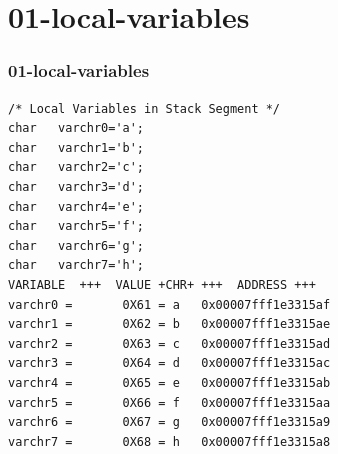 \documentclass[xcolor=table, notheorems, hyperref={pdfpagelabels=false}]{beamer}
\begin{document}
\section{01-local-variables}
\begin{frame}[fragile]
\frametitle{01-local-variables}


\begin{lstlisting}[basicstyle=\ttfamily\footnotesize]
/* Local Variables in Stack Segment */
char   varchr0='a';
char   varchr1='b';
char   varchr2='c';
char   varchr3='d';
char   varchr4='e';
char   varchr5='f';
char   varchr6='g';
char   varchr7='h';
VARIABLE  +++  VALUE +CHR+ +++  ADDRESS +++
varchr0 =       0X61 = a   0x00007fff1e3315af
varchr1 =       0X62 = b   0x00007fff1e3315ae
varchr2 =       0X63 = c   0x00007fff1e3315ad
varchr3 =       0X64 = d   0x00007fff1e3315ac
varchr4 =       0X65 = e   0x00007fff1e3315ab
varchr5 =       0X66 = f   0x00007fff1e3315aa
varchr6 =       0X67 = g   0x00007fff1e3315a9
varchr7 =       0X68 = h   0x00007fff1e3315a8
\end{lstlisting}

\begin{minipage}[t]{120mm}


\end{minipage}

\end{frame}

\end{document}
